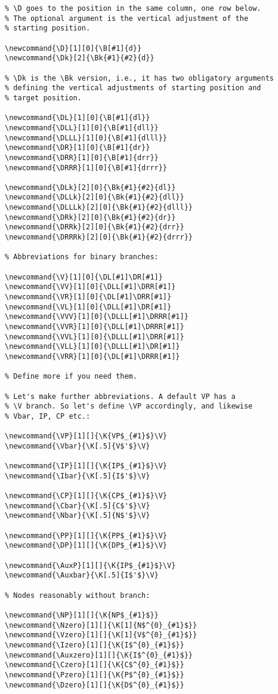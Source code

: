 \documentclass[12pt,a4paper]{article}
\begin{document}
\begin{verbatim}
% \D goes to the position in the same column, one row below.
% The optional argument is the vertical adjustment of the
% starting position.

\newcommand{\D}[1][0]{\B[#1]{d}}
\newcommand{\Dk}[2]{\Bk{#1}{#2}{d}}

% \Dk is the \Bk version, i.e., it has two obligatory arguments
% defining the vertical adjustments of starting position and
% target position.

\newcommand{\DL}[1][0]{\B[#1]{dl}}
\newcommand{\DLL}[1][0]{\B[#1]{dll}}
\newcommand{\DLLL}[1][0]{\B[#1]{dlll}}
\newcommand{\DR}[1][0]{\B[#1]{dr}}
\newcommand{\DRR}[1][0]{\B[#1]{drr}}
\newcommand{\DRRR}[1][0]{\B[#1]{drrr}}

\newcommand{\DLk}[2][0]{\Bk{#1}{#2}{dl}}
\newcommand{\DLLk}[2][0]{\Bk{#1}{#2}{dll}}
\newcommand{\DLLLk}[2][0]{\Bk{#1}{#2}{dlll}}
\newcommand{\DRk}[2][0]{\Bk{#1}{#2}{dr}}
\newcommand{\DRRk}[2][0]{\Bk{#1}{#2}{drr}}
\newcommand{\DRRRk}[2][0]{\Bk{#1}{#2}{drrr}}

% Abbreviations for binary branches:

\newcommand{\V}[1][0]{\DL[#1]\DR[#1]}
\newcommand{\VV}[1][0]{\DLL[#1]\DRR[#1]}
\newcommand{\VR}[1][0]{\DL[#1]\DRR[#1]}
\newcommand{\VL}[1][0]{\DLL[#1]\DR[#1]}
\newcommand{\VVV}[1][0]{\DLLL[#1]\DRRR[#1]}
\newcommand{\VVR}[1][0]{\DLL[#1]\DRRR[#1]}
\newcommand{\VVL}[1][0]{\DLLL[#1]\DRR[#1]}
\newcommand{\VLL}[1][0]{\DLLL[#1]\DR[#1]}
\newcommand{\VRR}[1][0]{\DL[#1]\DRRR[#1]}

% Define more if you need them.

% Let's make further abbreviations. A default VP has a
% \V branch. So let's define \VP accordingly, and likewise
% Vbar, IP, CP etc.:

\newcommand{\VP}[1][]{\K{VP$_{#1}$}\V}
\newcommand{\Vbar}{\K[.5]{V$'$}\V}

\newcommand{\IP}[1][]{\K{IP$_{#1}$}\V}
\newcommand{\Ibar}{\K[.5]{I$'$}\V}

\newcommand{\CP}[1][]{\K{CP$_{#1}$}\V}
\newcommand{\Cbar}{\K[.5]{C$'$}\V}
\newcommand{\Nbar}{\K[.5]{N$'$}\V}

\newcommand{\PP}[1][]{\K{PP$_{#1}$}\V}
\newcommand{\DP}[1][]{\K{DP$_{#1}$}\V}

\newcommand{\AuxP}[1][]{\K{IP$_{#1}$}\V}
\newcommand{\Auxbar}{\K[.5]{I$'$}\V}

% Nodes reasonably without branch:

\newcommand{\NP}[1][]{\K{NP$_{#1}$}}
\newcommand{\Nzero}[1][]{\K[1]{N$^{0}_{#1}$}}
\newcommand{\Vzero}[1][]{\K[1]{V$^{0}_{#1}$}}
\newcommand{\Izero}[1][]{\K{I$^{0}_{#1}$}}
\newcommand{\Auxzero}[1][]{\K{I$^{0}_{#1}$}}
\newcommand{\Czero}[1][]{\K{C$^{0}_{#1}$}}
\newcommand{\Pzero}[1][]{\K{P$^{0}_{#1}$}}
\newcommand{\Dzero}[1][]{\K{D$^{0}_{#1}$}}


\end{verbatim}
\end{document}
